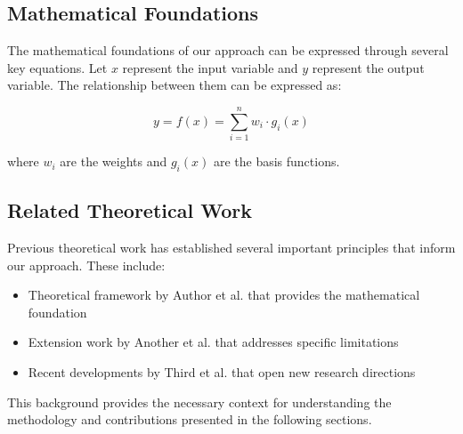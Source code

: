 \subsection{Mathematical Foundations}

The mathematical foundations of our approach can be expressed through several key equations. Let $x$ represent the input variable and $y$ represent the output variable. The relationship between them can be expressed as:

\begin{equation}
y = f(x) = \sum_{i=1}^{n} w_i \cdot g_i(x)
\end{equation}

where $w_i$ are the weights and $g_i(x)$ are the basis functions.

\subsection{Related Theoretical Work}

Previous theoretical work has established several important principles that inform our approach. These include:

\begin{itemize}
    \item Theoretical framework by Author et al. \cite{author2023} that provides the mathematical foundation
    \item Extension work by Another et al. \cite{another2022} that addresses specific limitations
    \item Recent developments by Third et al. \cite{third2024} that open new research directions
\end{itemize}

This background provides the necessary context for understanding the methodology and contributions presented in the following sections.
